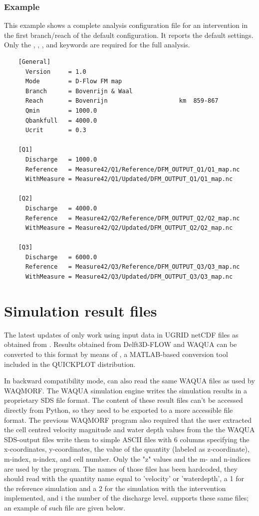 \subsubsection*{Example}

This example shows a complete analysis configuration file for an intervention in the first branch/reach of the default  configuration.
It reports the default settings.
Only the , , ,  and  keywords are required for the full analysis.

\begin{Verbatim}
    [General]
      Version     = 1.0
      Mode        = D-Flow FM map
      Branch      = Bovenrijn & Waal
      Reach       = Bovenrijn                    km  859-867
      Qmin        = 1000.0
      Qbankfull   = 4000.0
      Ucrit       = 0.3
    
    [Q1]
      Discharge   = 1000.0
      Reference   = Measure42/Q1/Reference/DFM_OUTPUT_Q1/Q1_map.nc
      WithMeasure = Measure42/Q1/Updated/DFM_OUTPUT_Q1/Q1_map.nc
    
    [Q2]
      Discharge   = 4000.0
      Reference   = Measure42/Q2/Reference/DFM_OUTPUT_Q2/Q2_map.nc
      WithMeasure = Measure42/Q2/Updated/DFM_OUTPUT_Q2/Q2_map.nc
    
    [Q3]
      Discharge   = 6000.0
      Reference   = Measure42/Q3/Reference/DFM_OUTPUT_Q3/Q3_map.nc
      WithMeasure = Measure42/Q3/Updated/DFM_OUTPUT_Q3/Q3_map.nc
\end{Verbatim}


\section{Simulation result files}

The latest updates of \dfastmi only work using input data in UGRID netCDF files as obtained from \dflowfm.
Results obtained from Delft3D-FLOW and WAQUA can be converted to this format by means of , a MATLAB-based conversion tool included in the QUICKPLOT distribution.

In backward compatibility mode, \dfmi can also read the same WAQUA files as used by WAQMORF.
The WAQUA simulation engine writes the simulation results in a proprietary SDS file format.
The content of these result files can't be accessed directly from Python, so they need to be exported to a more accessible file format.
The previous WAQMORF program also required that the user extracted the cell centred velocity magnitude and water depth values from the the WAQUA SDS-output files write them to simple ASCII files with 6 columns specifying the x-coordinates, y-coordinates, the value of the quantity (labeled as z-coordinate), m-index, n-index, and cell number.
Only the "z" values and the m- and n-indices are used by the program.
The names of those files has been hardcoded, they should read  with the quantity name equal to 'velocity' or 'waterdepth', a 1 for the reference simulation and a 2 for the simulation with the intervention implemented, and i the number of the discharge level.
\dfastmi supports these same files; an example of such file are given below.

